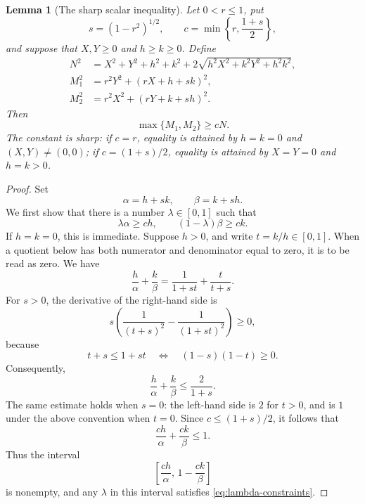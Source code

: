 \documentclass[11pt]{article}
\newtheorem{lemma}[theorem]{Lemma}
\theoremstyle{remark}
\begin{document}
\begin{lemma}[The sharp scalar inequality]
\label{lem:sharp-scalar-q}
Let \(0<r\leq 1\), put
\[
 s=(1-r^2)^{1/2},
 \qquad
 c=\min\left\{r,\frac{1+s}{2}\right\},
\]
and suppose that \(X,Y\geq0\) and \(h\geq k\geq0\).  Define
\[
 \begin{split}
 N^2&=X^2+Y^2+h^2+k^2
      +2\sqrt{h^2X^2+k^2Y^2+h^2k^2},\\
 M_1^2&=r^2Y^2+(rX+h+sk)^2,\\
 M_2^2&=r^2X^2+(rY+k+sh)^2.
 \end{split}
\]
Then
\[
 \max\{M_1,M_2\}\geq cN.
\]
The constant is sharp: if \(c=r\), equality is attained by
\(h=k=0\) and \((X,Y)\ne(0,0)\); if
\(c=(1+s)/2\), equality is attained by \(X=Y=0\) and
\(h=k>0\).
\end{lemma}

\begin{proof}
Set
\[
 \alpha=h+sk,\qquad \beta=k+sh.
\]
We first show that there is a number \(\lambda\in[0,1]\) such that
\begin{equation}
\label{eq:lambda-constraints}
 \lambda\alpha\geq ch,
 \qquad
 (1-\lambda)\beta\geq ck.
\end{equation}
If \(h=k=0\), this is immediate.  Suppose \(h>0\), and write
\(t=k/h\in[0,1]\).  When a quotient below has both numerator and
denominator equal to zero, it is to be read as zero.  We have
\[
 \frac{h}{\alpha}+\frac{k}{\beta}
   =\frac{1}{1+st}+\frac{t}{t+s}.
\]
For \(s>0\), the derivative of the right-hand side is
\[
 s\left(\frac{1}{(t+s)^2}
          -\frac{1}{(1+st)^2}\right)\geq0,
\]
because
\[
 t+s\leq1+st
 \quad\Longleftrightarrow\quad
 (1-s)(1-t)\geq0.
\]
Consequently,
\[
 \frac{h}{\alpha}+\frac{k}{\beta}
 \leq\frac{2}{1+s}.
\]
The same estimate holds when \(s=0\): the left-hand side is \(2\)
for \(t>0\), and is \(1\) under the above convention when \(t=0\).
Since \(c\leq(1+s)/2\), it follows that
\[
 \frac{ch}{\alpha}+\frac{ck}{\beta}\leq1.
\]
Thus the interval
\[
 \left[\frac{ch}{\alpha},\,1-\frac{ck}{\beta}\right]
\]
is nonempty, and any \(\lambda\) in this interval satisfies
\eqref{eq:lambda-constraints}.


\end{proof}
\end{document}
